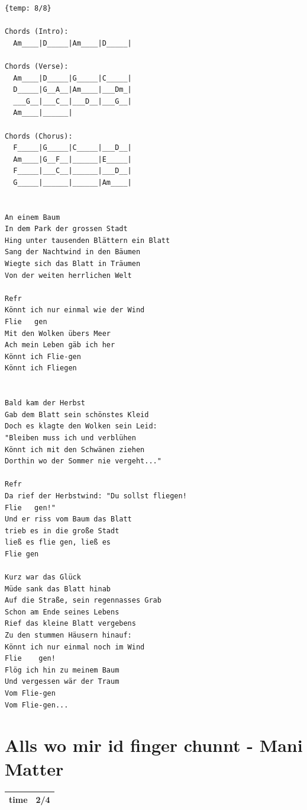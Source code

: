 \documentclass[
]{book}
\let\stdsection\section
\renewcommand\section{\clearpage\stdsection}
\begin{document}
\begin{verbatim}
{temp: 8/8}

Chords (Intro):
  Am____|D_____|Am____|D_____|

Chords (Verse):
  Am____|D_____|G_____|C_____|
  D_____|G__A__|Am____|___Dm_|
  ___G__|___C__|___D__|___G__|
  Am____|______|

Chords (Chorus):
  F_____|G_____|C_____|___D__|
  Am____|G__F__|______|E_____|
  F_____|___C__|______|___D__|
  G_____|______|______|Am____|


An einem Baum
In dem Park der grossen Stadt
Hing unter tausenden Blättern ein Blatt
Sang der Nachtwind in den Bäumen
Wiegte sich das Blatt in Träumen
Von der weiten herrlichen Welt

Refr
Könnt ich nur einmal wie der Wind
Flie   gen
Mit den Wolken übers Meer
Ach mein Leben gäb ich her
Könnt ich Flie-gen
Könnt ich Fliegen


Bald kam der Herbst
Gab dem Blatt sein schönstes Kleid
Doch es klagte den Wolken sein Leid:
"Bleiben muss ich und verblühen
Könnt ich mit den Schwänen ziehen
Dorthin wo der Sommer nie vergeht..."

Refr
Da rief der Herbstwind: "Du sollst fliegen! 
Flie   gen!"
Und er riss vom Baum das Blatt
trieb es in die große Stadt
ließ es flie gen, ließ es
Flie gen
 
Kurz war das Glück
Müde sank das Blatt hinab
Auf die Straße, sein regennasses Grab
Schon am Ende seines Lebens
Rief das kleine Blatt vergebens
Zu den stummen Häusern hinauf:
Könnt ich nur einmal noch im Wind
Flie    gen!
Flög ich hin zu meinem Baum
Und vergessen wär der Traum
Vom Flie-gen
Vom Flie-gen...
\end{verbatim}

\hypertarget{alls-wo-mir-id-finger-chunnt---mani-matter}{%
\section{Alls wo mir id finger chunnt - Mani Matter}\label{alls-wo-mir-id-finger-chunnt---mani-matter}}

\begin{longtable}[]{@{}ll@{}}
\toprule
\endhead
time & 2/4\tabularnewline
\bottomrule
\end{longtable}
\end{document}
